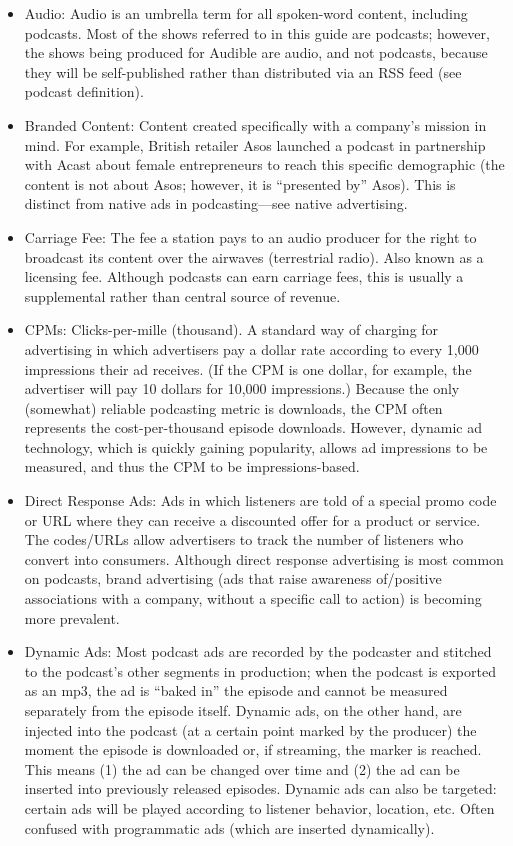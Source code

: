 \documentclass[notoc, symmetric, nobib, nols]{towcenter-guideto-book}
\begin{document}
\begin{itemize}
\item Audio: Audio is an umbrella term for all spoken-word content, including podcasts. Most of the shows referred to in this guide are podcasts; however, the shows being produced for Audible are audio, and not podcasts, because they will be self-published rather than distributed via an RSS feed (see podcast definition).

\item Branded Content: Content created specifically with a company's mission in mind. For example, British retailer Asos launched a podcast in partnership with Acast about female entrepreneurs to reach this specific demographic (the content is not about Asos; however, it is ``presented by'' Asos). This is distinct from native ads in podcasting---see native advertising.

\item Carriage Fee: The fee a station pays to an audio producer for the right to broadcast its content over the airwaves (terrestrial radio). Also known as a licensing fee. Although podcasts can earn carriage fees, this is usually a supplemental rather than central source of revenue.

\item CPMs: Clicks-per-mille (thousand). A standard way of charging for advertising in which advertisers pay a dollar rate according to every 1,000 impressions their ad receives. (If the CPM is one dollar, for example, the advertiser will pay 10 dollars for 10,000 impressions.) Because the only (somewhat) reliable podcasting metric is downloads, the CPM often represents the cost-per-thousand episode downloads. However, dynamic ad technology, which is quickly gaining popularity, allows ad impressions to be measured, and thus the CPM to be impressions-based.

\item Direct Response Ads: Ads in which listeners are told of a special promo code or URL where they can receive a discounted offer for a product or service. The codes/URLs allow advertisers to track the number of listeners who convert into consumers. Although direct response advertising is most common on podcasts, brand advertising (ads that raise awareness of/positive associations with a company, without a specific call to action) is becoming more prevalent.

\item Dynamic Ads: Most podcast ads are recorded by the podcaster and stitched to the podcast's other segments in production; when the podcast is exported as an mp3, the ad is ``baked in'' the episode and cannot be measured separately from the episode itself. Dynamic ads, on the other hand, are injected into the podcast (at a certain point marked by the producer) the moment the episode is downloaded or, if streaming, the marker is reached. This means (1) the ad can be changed over time and (2) the ad can be inserted into previously released episodes. Dynamic ads can also be targeted: certain ads will be played according to listener behavior, location, etc. Often confused with programmatic ads (which are inserted dynamically).


\end{itemize}
\end{document}
